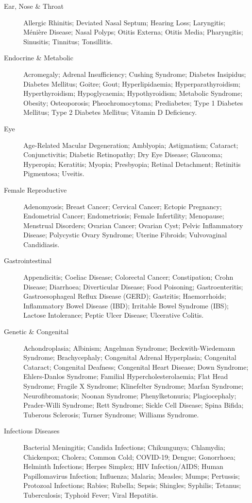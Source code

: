 \begin{description}
\item[Ear, Nose \& Throat] Allergic Rhinitis; Deviated Nasal Septum; Hearing Loss; Laryngitis; Ménière Disease; Nasal Polyps; Otitis Externa; Otitis Media; Pharyngitis; Sinusitis; Tinnitus; Tonsillitis.

\item[Endocrine \& Metabolic] Acromegaly; Adrenal Insufficiency; Cushing Syndrome; Diabetes Insipidus; Diabetes Mellitus; Goitre; Gout; Hyperlipidaemia; Hyperparathyroidism; Hyperthyroidism; Hypoglycaemia; Hypothyroidism; Metabolic Syndrome; Obesity; Osteoporosis; Pheochromocytoma; Prediabetes; Type 1 Diabetes Mellitus; Type 2 Diabetes Mellitus; Vitamin D Deficiency.

\item[Eye] Age-Related Macular Degeneration; Amblyopia; Astigmatism; Cataract; Conjunctivitis; Diabetic Retinopathy; Dry Eye Disease; Glaucoma; Hyperopia; Keratitis; Myopia; Presbyopia; Retinal Detachment; Retinitis Pigmentosa; Uveitis.

\item[Female Reproductive] Adenomyosis; Breast Cancer; Cervical Cancer; Ectopic Pregnancy; Endometrial Cancer; Endometriosis; Female Infertility; Menopause; Menstrual Disorders; Ovarian Cancer; Ovarian Cyst; Pelvic Inflammatory Disease; Polycystic Ovary Syndrome; Uterine Fibroids; Vulvovaginal Candidiasis.

\item[Gastrointestinal] Appendicitis; Coeliac Disease; Colorectal Cancer; Constipation; Crohn Disease; Diarrhoea; Diverticular Disease; Food Poisoning; Gastroenteritis; Gastroesophageal Reflux Disease (GERD); Gastritis; Haemorrhoids; Inflammatory Bowel Disease (IBD); Irritable Bowel Syndrome (IBS); Lactose Intolerance; Peptic Ulcer Disease; Ulcerative Colitis.

\item[Genetic \& Congenital] Achondroplasia; Albinism; Angelman Syndrome; Beckwith-Wiedemann Syndrome; Brachycephaly; Congenital Adrenal Hyperplasia; Congenital Cataract; Congenital Deafness; Congenital Heart Disease; Down Syndrome; Ehlers-Danlos Syndrome; Familial Hypercholesterolaemia; Flat Head Syndrome; Fragile X Syndrome; Klinefelter Syndrome; Marfan Syndrome; Neurofibromatosis; Noonan Syndrome; Phenylketonuria; Plagiocephaly; Prader-Willi Syndrome; Rett Syndrome; Sickle Cell Disease; Spina Bifida; Tuberous Sclerosis; Turner Syndrome; Williams Syndrome.

\item[Infectious Diseases] Bacterial Meningitis; Candida Infections; Chikungunya; Chlamydia; Chickenpox; Cholera; Common Cold; COVID-19; Dengue; Gonorrhoea; Helminth Infections; Herpes Simplex; HIV Infection/AIDS; Human Papillomavirus Infection; Influenza; Malaria; Measles; Mumps; Pertussis; Protozoal Infections; Rabies; Rubella; Sepsis; Shingles; Syphilis; Tetanus; Tuberculosis; Typhoid Fever; Viral Hepatitis.


\end{description}
